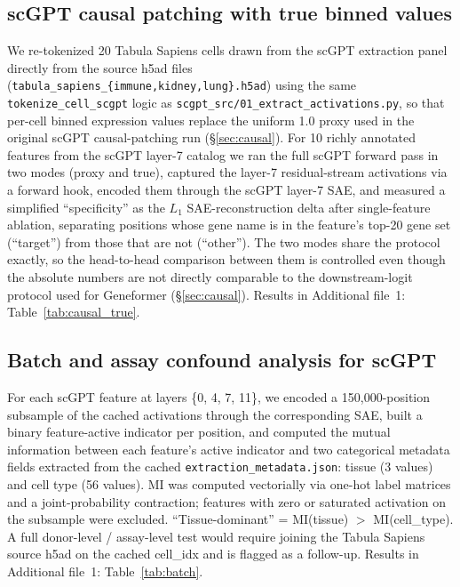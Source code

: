 \documentclass[onecolumn]{article}
\begin{document}
\subsection{scGPT causal patching with true binned values}

We re-tokenized 20 Tabula Sapiens cells drawn from the scGPT extraction panel directly from the source h5ad files (\texttt{tabula\_sapiens\_\{immune,kidney,lung\}.h5ad}) using the same \texttt{tokenize\_cell\_scgpt} logic as \texttt{scgpt\_src/01\_extract\_activations.py}, so that per-cell binned expression values replace the uniform 1.0 proxy used in the original scGPT causal-patching run (\S\ref{sec:causal}). For 10 richly annotated features from the scGPT layer-7 catalog we ran the full scGPT forward pass in two modes (proxy and true), captured the layer-7 residual-stream activations via a forward hook, encoded them through the scGPT layer-7 SAE, and measured a simplified ``specificity'' as the $L_1$ SAE-reconstruction delta after single-feature ablation, separating positions whose gene name is in the feature's top-20 gene set (``target'') from those that are not (``other''). The two modes share the protocol exactly, so the head-to-head comparison between them is controlled even though the absolute numbers are not directly comparable to the downstream-logit protocol used for Geneformer (\S\ref{sec:causal}). Results in Additional file~1: Table~\ref{tab:causal_true}.

\subsection{Batch and assay confound analysis for scGPT}

For each scGPT feature at layers \{0, 4, 7, 11\}, we encoded a 150{,}000-position subsample of the cached activations through the corresponding SAE, built a binary feature-active indicator per position, and computed the mutual information between each feature's active indicator and two categorical metadata fields extracted from the cached \texttt{extraction\_metadata.json}: tissue (3 values) and cell type (56 values). MI was computed vectorially via one-hot label matrices and a joint-probability contraction; features with zero or saturated activation on the subsample were excluded. ``Tissue-dominant'' = MI(tissue) $>$ MI(cell\_type). A full donor-level / assay-level test would require joining the Tabula Sapiens source h5ad on the cached cell\_idx and is flagged as a follow-up. Results in Additional file~1: Table~\ref{tab:batch}.
\end{document}

